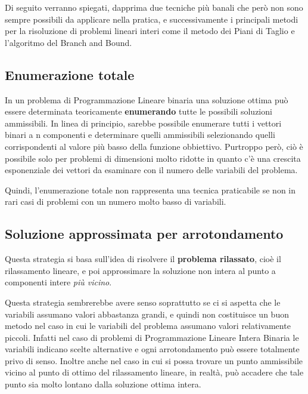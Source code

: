 Di seguito verranno spiegati, dapprima due tecniche più banali che però non sono sempre possibili da applicare nella pratica, e successivamente i principali metodi per la risoluzione di problemi lineari interi come il metodo dei Piani di Taglio e l'algoritmo del Branch and Bound.

\subsection{Enumerazione totale}
In un problema di Programmazione Lineare binaria una soluzione ottima può essere determinata teoricamente \textbf{enumerando} tutte le possibili soluzioni ammissibili. In linea di principio, sarebbe possibile enumerare tutti i vettori binari a n componenti e determinare quelli ammissibili selezionando quelli corrispondenti al valore più basso della funzione obbiettivo.
Purtroppo però, ciò è possibile solo per problemi di dimensioni molto ridotte in quanto c'è una crescita esponenziale dei vettori da esaminare con il numero delle variabili del problema.

Quindi, l'enumerazione totale non rappresenta una tecnica praticabile se non in rari casi di problemi con un numero molto basso di variabili.

\subsection{Soluzione approssimata per arrotondamento}
Questa strategia si basa sull'idea di risolvere il \textbf{problema rilassato}, cioè il rilassamento lineare, e poi approssimare la soluzione non intera al punto a componenti intere \textit{più vicino}.

Questa strategia sembrerebbe avere senso soprattutto se ci si aspetta che le variabili assumano valori abbastanza grandi, e quindi non costituisce un buon metodo nel caso in cui le variabili del problema assumano valori relativamente piccoli. Infatti nel caso di problemi di Programmazione Lineare Intera Binaria le variabili indicano scelte alternative e ogni arrotondamento può essere totalmente privo di senso. Inoltre anche nel caso in cui si possa trovare un punto ammissibile vicino al punto di ottimo del rilassamento lineare, in realtà, può accadere che tale punto sia molto lontano dalla soluzione ottima intera.

